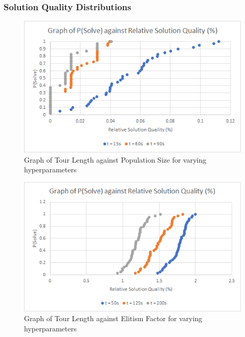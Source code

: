 \documentclass[sigconf]{acmart}
\begin{document}
\subsubsection{Solution Quality Distributions}
\begin{figure}[h]
  \centering
  \includegraphics[width=\linewidth=]{genetic_sqd_Atlanta.png}
  \caption{Graph of Tour Length against Population Size for varying hyperparameters}
\end{figure}
\begin{figure}[h]
  \centering
  \includegraphics[width=\linewidth]{genetic_sqd_NYC.png}
  \caption{Graph of Tour Length against Elitism Factor for varying hyperparameters}
\end{figure}
\end{document}

